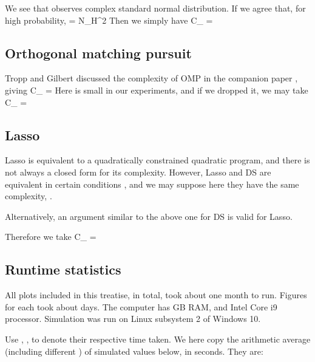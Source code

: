 We see that  observes complex standard normal distribution.
If we agree that, for high probability,
%
 {
 
= \s N_H^2   
}
Then we simply have
%
 {
C_{}
=  
}

\subsection {Orthogonal matching pursuit}

Tropp and Gilbert \cite {TrG07a} discussed the complexity of OMP in the companion paper \cite {TrG07b}, giving
%
 {
C_{}
= 
}
%
Here  is small in our experiments, and if we dropped it, we may take
 {
C_{}
= 
}

\subsection {Lasso}

Lasso is equivalent to a quadratically constrained quadratic program, and there is not always a closed form for its complexity.
However, Lasso and DS are equivalent in certain conditions \cite {AsR10}, and we may suppose here they have the same complexity, .

Alternatively, an argument similar to the above one for DS is valid for Lasso.

Therefore we take
 {
C_{}
= 
}

\subsection {Runtime statistics}

All plots included in this treatise, in total, took about one month to run.
Figures for  each took about  days.
The computer has  GB RAM, and Intel Core i9 processor.
Simulation was run on Linux subsystem 2 of Windows 10.

Use , ,  to denote their respective time taken.
We here copy the arithmetic average (including different \m {\s}) of simulated values below, in seconds.
They are:
%
%

